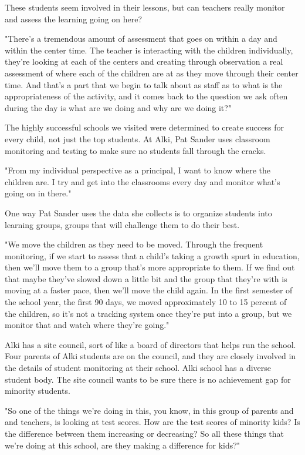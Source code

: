 These students seem involved in their lessons, but can teachers really monitor and assess the learning going on here?

"There's a tremendous amount of assessment that goes on within a day and within the center time. The teacher is interacting with the children individually, they're looking at each of the centers and creating through observation a real assessment of where each of the children are at as they move through their center time. And that's a part that we begin to talk about as staff as to what is the appropriateness of the activity, and it comes back to the question we ask often during the day is what are we doing and why are we doing it?"

The highly successful schools we visited were determined to create success for every child, not just the top students. At Alki, Pat Sander uses classroom monitoring and testing to make sure no students fall through the cracks.

"From my individual perspective as a principal, I want to know where the children are. I try and get into the classrooms every day and monitor what's going on in there."

One way Pat Sander uses the data she collects is to organize students into learning groups, groups that will challenge them to do their best.

"We move the children as they need to be moved. Through the frequent monitoring, if we start to assess that a child's taking a growth spurt in education, then we'll move them to a group that's more appropriate to them. If we find out that maybe they've slowed down a little bit and the group that they're with is moving at a faster pace, then we'll move the child again. In the first semester of the school year, the first 90 days, we moved approximately 10 to 15 percent of the children, so it's not a tracking system once they're put into a group, but we monitor that and watch where they're going."

Alki has a site council, sort of like a board of directors that helps run the school. Four parents of Alki students are on the council, and they are closely involved in the details of student monitoring at their school. Alki school has a diverse student body. The site council wants to be sure there is no achievement gap for minority students.

"So one of the things we're doing in this, you know, in this group of parents and and teachers, is looking at test scores. How are the test scores of minority kids? Is the difference between them increasing or decreasing? So all these things that we're doing at this school, are they making a difference for kids?"

